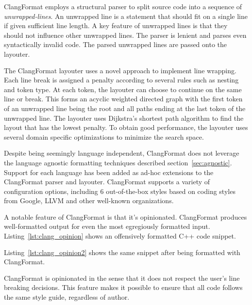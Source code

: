 ClangFormat employs a structural parser to split source code into a sequence of \emph{unwrapped-lines}.
An unwrapped line is a statement that should fit on a single line if given sufficient line length.
A key feature of unwrapped lines is that they should not influence other unwrapped lines.
The parser is lenient and parses even syntactically invalid code.
The parsed unwrapped lines are passed onto the layouter.

The ClangFormat layouter uses a novel approach to implement line wrapping.
Each line break is assigned a penalty according to several rules such as nesting and token type.
At each token, the layouter can choose to continue on the same line or break.
This forms an acyclic weighted directed graph with the first token of an unwrapped line being the root and all paths ending at the last token of the unwrapped line.
The layouter uses Dijkstra's\autocite{dijkstra_note_1959} shortest path algorithm to find the layout that has the lowest penalty.
To obtain good performance, the layouter uses several domain specific optimizations to minimize the search space.

Despite being seemingly language independent, ClangFormat does not leverage the language agnostic formatting techniques described section~\ref{sec:agnostic}.
Support for each language has been added as ad-hoc extensions to the ClangFormat parser and layouter.
ClangFormat supports a variety of configuration options, including 6 out-of-the-box styles based on coding styles from Google, LLVM and other well-known organizations.

A notable feature of ClangFormat is that it's opinionated.
ClangFormat produces well-formatted output for even the most egregiously formatted input.
Listing~\ref{lst:clang_opinion} shows an offensively formatted C++ code snippet.

Listing~\ref{lst:clang_opinion2} shows the same snippet after being formatted with ClangFormat.

ClangFormat is opinionated in the sense that it does not respect the user's line breaking decisions.
This feature makes it possible to ensure that all code follows the same style guide, regardless of author.

